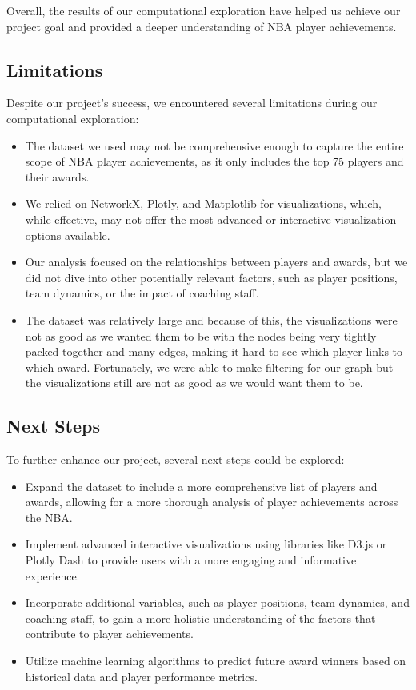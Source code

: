 \documentclass[fontsize=11pt]{article}
\begin{document}
Overall, the results of our computational exploration have helped us achieve our project goal and provided a deeper understanding of NBA player achievements.

\subsection{Limitations}

Despite our project's success, we encountered several limitations during our computational exploration:

\begin{itemize}
\item The dataset we used may not be comprehensive enough to capture the entire scope of NBA player achievements, as it only includes the top 75 players and their awards.
\item We relied on NetworkX, Plotly, and Matplotlib for visualizations, which, while effective, may not offer the most advanced or interactive visualization options available.
\item Our analysis focused on the relationships between players and awards, but we did not dive into other potentially relevant factors, such as player positions, team dynamics, or the impact of coaching staff.
\item The dataset was relatively large and because of this, the visualizations were not as good as we wanted them to be with the nodes being very tightly packed together and many edges, making it hard to see which player links to which award. Fortunately, we were able to make filtering for our graph but the visualizations still are not as good as we would want them to be.
\end{itemize}

\subsection{Next Steps}

To further enhance our project, several next steps could be explored:

\begin{itemize}
\item Expand the dataset to include a more comprehensive list of players and awards, allowing for a more thorough analysis of player achievements across the NBA.
\item Implement advanced interactive visualizations using libraries like D3.js or Plotly Dash to provide users with a more engaging and informative experience.
\item Incorporate additional variables, such as player positions, team dynamics, and coaching staff, to gain a more holistic understanding of the factors that contribute to player achievements.
\item Utilize machine learning algorithms to predict future award winners based on historical data and player performance metrics.
\end{itemize}
\end{document}
